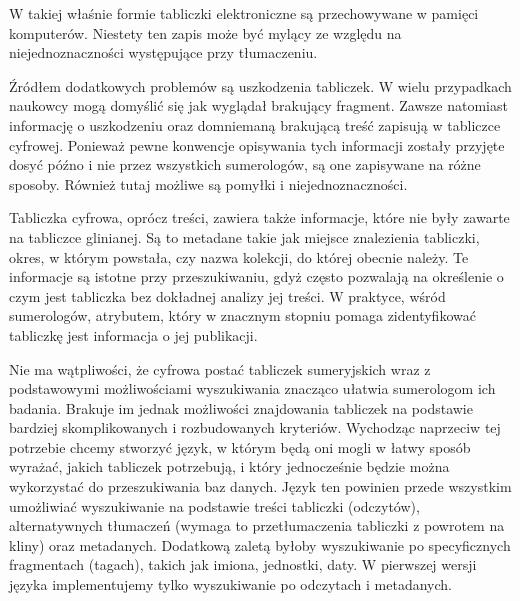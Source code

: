W takiej właśnie formie tabliczki elektroniczne są przechowywane w pamięci komputerów. 
Niestety ten zapis może być mylący ze względu na niejednoznaczności występujące przy tłumaczeniu. 

Źródłem dodatkowych problemów są uszkodzenia tabliczek. 
W wielu przypadkach naukowcy mogą domyślić się jak wyglądał brakujący fragment. 
Zawsze natomiast informację o uszkodzeniu oraz domniemaną brakującą treść zapisują w tabliczce cyfrowej.
Ponieważ pewne konwencje opisywania tych informacji zostały przyjęte dosyć późno i nie przez wszystkich sumerologów, 
są one zapisywane na różne sposoby. Również tutaj możliwe są pomyłki i niejednoznaczności.

Tabliczka cyfrowa, oprócz treści, zawiera także informacje, które nie były zawarte na tabliczce glinianej. 
Są to metadane takie jak miejsce znalezienia tabliczki, okres, w którym powstała, czy nazwa kolekcji, do której obecnie należy. 
Te informacje są istotne przy przeszukiwaniu, gdyż często pozwalają na określenie o czym jest tabliczka bez dokładnej analizy 
jej treści. 
W praktyce, wśród sumerologów, atrybutem, który w znacznym stopniu pomaga zidentyfikować tabliczkę jest informacja o jej publikacji.

Nie ma wątpliwości, że cyfrowa postać tabliczek sumeryjskich wraz z podstawowymi możliwościami wyszukiwania znacząco
ułatwia sumerologom ich badania. Brakuje im jednak możliwości znajdowania tabliczek na podstawie
bardziej skomplikowanych i rozbudowanych kryteriów.
Wychodząc naprzeciw tej potrzebie chcemy stworzyć język, w którym będą oni mogli w łatwy sposób wyrażać, 
jakich tabliczek potrzebują, i który jednocześnie będzie można wykorzystać do przeszukiwania baz danych. 
Język ten powinien przede wszystkim umożliwiać wyszukiwanie na podstawie treści tabliczki (odczytów), 
alternatywnych tłumaczeń (wymaga to przetłumaczenia tabliczki z powrotem na kliny) oraz metadanych.
Dodatkową zaletą byłoby wyszukiwanie po specyficznych fragmentach (tagach), takich jak imiona, jednostki, daty.
W pierwszej wersji języka implementujemy tylko wyszukiwanie po odczytach i metadanych.